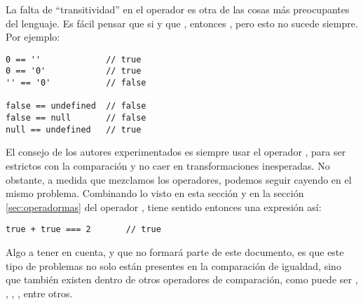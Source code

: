 La falta de "`transitividad"' en el operador \code{==} es otra de las cosas más preocupantes del lenguaje. Es fácil pensar que si  y que , entonces , pero esto no sucede siempre.  Por ejemplo:

\begin{lstlisting}[title={Falta de transitividad en \code{==}}]
0 == ''             // true
0 == '0'            // true
'' == '0'           // false

false == undefined  // false
false == null       // false
null == undefined   // true
\end{lstlisting}

El consejo de los autores experimentados es siempre usar el operador \code{===}, para ser estrictos con la comparación y no caer en transformaciones inesperadas. No obstante, a medida que mezclamos los operadores, podemos seguir cayendo en el mismo problema. Combinando lo visto en esta sección y en la sección \ref{sec:operadormas} del operador \code{+}, tiene sentido entonces una expresión así:

\begin{lstlisting}
true + true === 2		// true
\end{lstlisting}

Algo a tener en cuenta, y que no formará parte de este documento, es que este tipo de problemas no solo están presentes en la comparación de igualdad, sino que también existen dentro de otros operadores de comparación, como puede ser \code{>}, \code{>=}, \code{<}, \code{<=}, entre otros.
